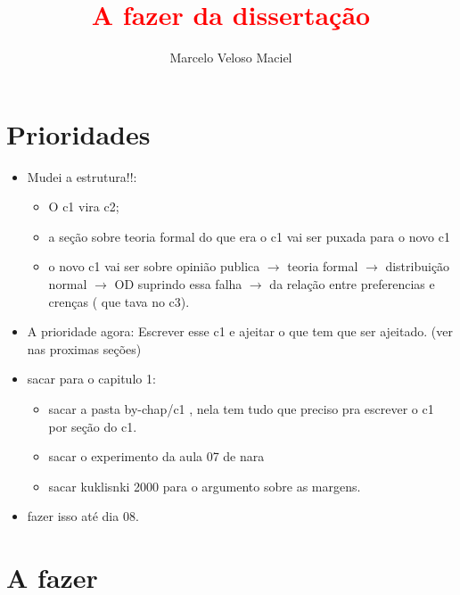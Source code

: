 \documentclass{article}
\title{\textcolor{red}{A fazer da dissertação}}
\author{Marcelo Veloso Maciel}
\date{}
\begin{document}
\pagecolor{base03}
\color{base1}



\maketitle

\section*{Prioridades}

\begin{itemize}
\item  {\Large Mudei a estrutura!!}:
  \begin{itemize}
  \item O c1 vira c2;
  \item a seção sobre teoria formal do que era o c1 vai ser puxada para o novo c1
  \item o novo c1 vai ser sobre opinião publica $\rightarrow$ teoria formal $\rightarrow$
    distribuição normal $\rightarrow$ OD suprindo essa falha $\rightarrow$ da relação entre
    preferencias e crenças ( que tava no c3). 
  \end{itemize}
  \item {\Large A prioridade agora: Escrever esse c1 e ajeitar o que tem que ser
      ajeitado. (ver nas proximas seções)}
\item {\Large sacar para o capitulo 1:}
  \begin{itemize}
    \item sacar a pasta by-chap/c1 , nela tem tudo que preciso pra escrever o c1
      por seção do c1. 
    \item sacar o experimento da aula 07 de nara
    \item sacar kuklisnki 2000 para o argumento sobre as margens.
    \end{itemize}
\item {\Large fazer isso até dia 08.}
\end{itemize}

\section*{A fazer}
\end{document}
